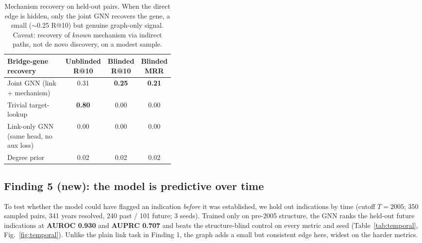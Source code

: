 \documentclass[11pt]{article}
\begin{document}
\begin{table}[H]
\centering\small
\begin{tabular}{>{\raggedright\arraybackslash}p{0.40\linewidth} cc c}
\toprule
\rowcolor{sriblue}\color{white}\textbf{Bridge-gene recovery} & \color{white}\textbf{Unblinded R@10} & \color{white}\textbf{Blinded R@10} & \color{white}\textbf{Blinded MRR}\\
\midrule
\rowcolor{srirow} Joint GNN (link + mechanism) & 0.31 & \textbf{0.25} & \textbf{0.21}\\
Trivial target-lookup & \textbf{0.80} & 0.00 & 0.00\\
\rowcolor{srirow} Link-only GNN (same head, no aux loss) & 0.00 & 0.00 & 0.00\\
Degree prior & 0.02 & 0.02 & 0.02\\
\bottomrule
\end{tabular}
\caption{Mechanism recovery on held-out pairs. When the direct edge is hidden, only the
joint GNN recovers the gene, a small ($\sim$0.25 R@10) but genuine graph-only signal.
Caveat: recovery of \emph{known} mechanism via indirect paths, not de novo discovery, on a
modest sample.}
\label{tab:mechrec}
\end{table}

\subsection{Finding 5 (new): the model is predictive over time}
To test whether the model could have flagged an indication \emph{before} it was
established, we hold out indications by time (cutoff $T=2005$; 350 sampled pairs, 341 years
resolved, 240 past / 101 future; 3 seeds). Trained only on pre-2005 structure, the GNN
ranks the held-out future indications at \textbf{AUROC 0.930} and \textbf{AUPRC 0.707} and
beats the structure-blind control on every metric and seed (Table~\ref{tab:temporal},
Fig.~\ref{fig:temporal}). Unlike the plain link task in Finding 1, the graph adds a small
but consistent edge here, widest on the harder metrics.
\end{document}
